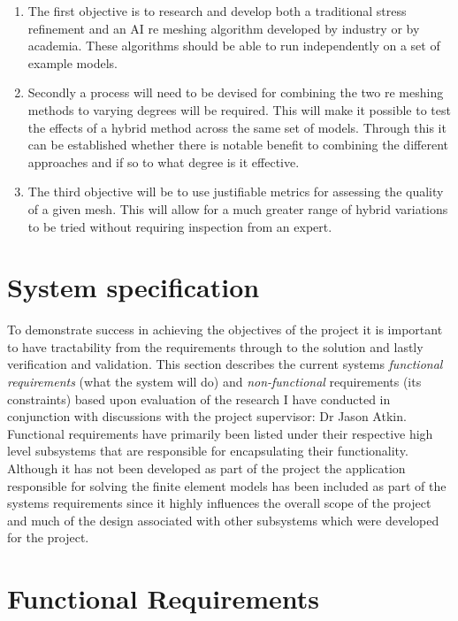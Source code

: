 \documentclass{article}
\begin{document}
\begin{enumerate}[label=\Alph*]

\item The first objective is to research and develop both a traditional stress refinement and an AI re meshing algorithm developed by industry or by academia. These algorithms should be able to run independently on a set of example models.

\item Secondly a process will need to be devised for combining the two re meshing methods to varying degrees will be required. This will make it possible to test the effects of a hybrid method across the same set of models. Through this it can be established whether there is notable benefit to combining the different approaches and if so to what degree is it effective.

\item The third objective will be to use justifiable metrics for assessing the quality of a given mesh. This will allow for a much greater range of hybrid variations to be tried without requiring inspection from an expert. 
\end{enumerate}

\section{System specification}
To demonstrate success in achieving the objectives of the project it is important to have tractability from the requirements through to the solution and lastly verification and validation. This section describes the current systems \textit{functional requirements} (what the system will do) and \textit{non-functional} requirements (its constraints) based upon evaluation of the research I have conducted in conjunction with discussions with the project supervisor: Dr Jason Atkin. Functional requirements have primarily been listed under their respective high level subsystems that are responsible for encapsulating their functionality. \\ 

\noindent
Although it has not been developed as part of the project the application responsible for solving the finite element models has been included as part of the systems requirements since it highly influences the overall scope of the project and much of the design associated with other subsystems which were developed for the project. \\ 

\section{Functional Requirements}
\end{document}
